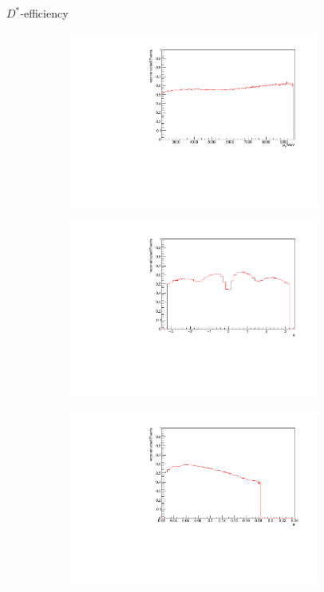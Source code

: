 \documentclass[11pt]{beamer}
\begin{document}
\begin{frame}{$D^*$-efficiency}
\begin{figure}
\begin{subfigure}{0.45\textwidth}
\includegraphics[width=0.9\textwidth]{up_pdf/single/pos/h_pt_reco_Dst_pos.pdf}
\end{subfigure}
\begin{subfigure}{0.45\textwidth}
\includegraphics[width=0.9\textwidth]{up_pdf/single/pos/h_phi_reco_Dst_pos.pdf}
\end{subfigure}
\begin{subfigure}{0.45\textwidth}
\includegraphics[width=0.9\textwidth]{up_pdf/single/pos/h_theta_reco_Dst_pos.pdf}

\end{subfigure}
\end{figure}
\end{frame}
\end{document}
